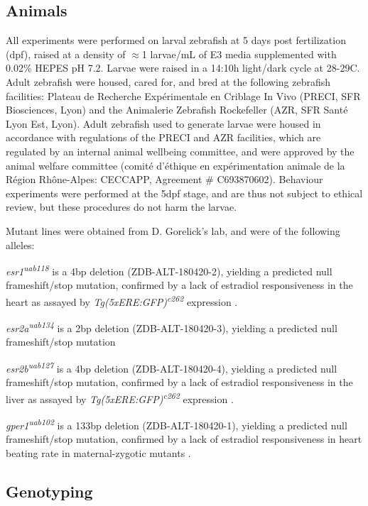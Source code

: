 \documentclass[9.5pt,lineno]{RandlettLab_elife}
\begin{document}
\subsection{Animals}

All experiments were performed on larval zebrafish at 5 days post fertilization (dpf), raised at a density of $\approx$1 larvae/mL of E3 media supplemented with 0.02\% HEPES pH 7.2. 
Larvae were raised in a 14:10h light/dark cycle at 28-29\degree{}C. 
Adult zebrafish were housed, cared for, and bred at the following zebrafish facilities: Plateau de Recherche Expérimentale en Criblage In Vivo (PRECI, SFR Biosciences, Lyon) and the Animalerie Zebrafish Rockefeller (AZR, SFR Santé Lyon Est, Lyon). Adult zebrafish used to generate larvae were housed in accordance with regulations of the PRECI and AZR facilities, which are regulated by an internal animal wellbeing committee, and were approved by the animal welfare committee (comité d’éthique en expérimentation animale de la Région Rhône-Alpes: CECCAPP, Agreement \# C693870602). 
Behaviour experiments were performed at the 5dpf stage, and are thus not subject to ethical review, but these procedures do not harm the larvae. 

Mutant lines were obtained from D. Gorelick's lab, and were of the following alleles: 

\emph{esr1\textsuperscript{uab118}} is a 4bp deletion (ZDB-ALT-180420-2), yielding a predicted null frameshift/stop mutation, confirmed by a lack of estradiol responsiveness in the heart as assayed by \emph{Tg(5xERE:GFP)\textsuperscript{c262}} expression \citep{Romano2017-ep}. 

\emph{esr2a\textsuperscript{uab134}} is a 2bp deletion (ZDB-ALT-180420-3), yielding a predicted null frameshift/stop mutation \citep{Romano2017-ep}

\emph{esr2b\textsuperscript{uab127}} is a 4bp deletion (ZDB-ALT-180420-4), yielding a predicted null frameshift/stop mutation, confirmed by a lack of estradiol responsiveness in the liver as assayed by \emph{Tg(5xERE:GFP)\textsuperscript{c262}} expression \citep{Romano2017-ep}. 

\emph{gper1\textsuperscript{uab102}} is a 133bp deletion (ZDB-ALT-180420-1), yielding a predicted null frameshift/stop mutation, confirmed by a lack of estradiol responsiveness in heart beating rate in maternal-zygotic mutants \citep{Romano2017-ep}.

\subsection{Genotyping}
\end{document}
